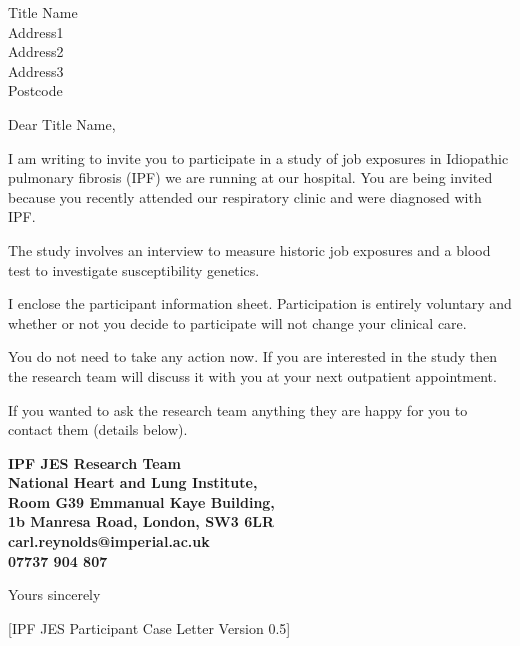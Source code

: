 \documentclass[ipfjes-centre,letterpaper,pagesize,UScommercial9]{scrlttr2}
\begin{document}
\begin{letter}{Title Name \\ Address1 \\ Address2 \\ Address3 \\ Postcode}


\opening{Dear Title Name,}

     I am writing to invite you to participate in a study of job exposures in Idiopathic pulmonary fibrosis (IPF) we are running at our hospital. You are being invited because you recently attended our respiratory clinic and were diagnosed with IPF. 
     
     The study involves an interview to measure historic job exposures and a blood test to investigate susceptibility genetics. 
     
    I enclose the participant information sheet. Participation is entirely voluntary and whether or not you decide to participate will not change your clinical care. 
    
    You do not need to take any action now. If you are interested in the study then the research team will discuss it with you at your next outpatient appointment.

    If you wanted to ask the research team anything they are happy for you to contact them (details below).

    \vspace{1cm}
    \begin{centering}
    \textbf{
    IPF JES Research Team \\  
    National Heart and Lung Institute, \\
    Room G39 Emmanual Kaye Building, \\
    1b Manresa Road, London, SW3 6LR\\
    carl.reynolds@imperial.ac.uk \\
    07737 904 807 \\
    }
    \end{centering}
    \vspace{1cm}

\closing{Yours sincerely}

     \vfill \hfill [IPF JES Participant Case Letter Version 0.5]


\end{letter}
\end{document}
